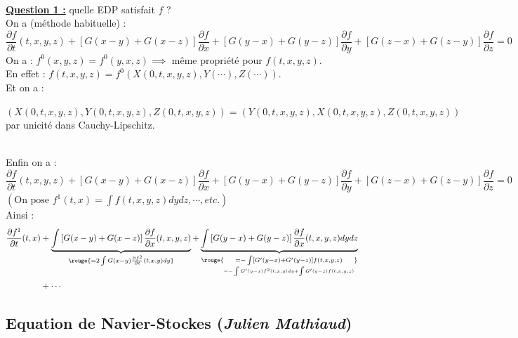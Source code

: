 \documentclass[12pt,a4paper]{article}
\begin{document}
		\begin{sol}$ $\\
			\begin{minipage}[t]{18.5cm}
				\textbf{\underline{Question 1 :}} quelle EDP satisfait $f$ ?\\
			On a (méthode habituelle) : 
			\[\dfrac{\partial f}{\partial t}(t,x,y,z)+\left[G(x-y)+G(x-z)\right]\dfrac{\partial f}{\partial x} + \left[G(y-x)+G(y-z)\right]\dfrac{\partial f}{\partial y} + \left[G(z-x)+G(z-y)\right]\dfrac{\partial f}{\partial z} = 0\]
			On a : $f^0(x,y,z) = f^0(y,x,z) \implies$ même propriété pour $f(t,x,y,z)$.\\
			En effet : $f(t,x,y,z) = f^0(X(0,t,x,y,z),Y(\cdots),Z(\cdots))$.\\
			Et on a : \begin{minipage}[t]{17cm}
				$(X(0,t,x,y,z),Y(0,t,x,y,z),Z(0,t,x,y,z)) = (Y(0,t,x,y,z),X(0,t,x,y,z),Z(0,t,x,y,z))$ par unicité dans Cauchy-Lipschitz.
			\end{minipage}\\
			Enfin on a : 
			\[\dfrac{\partial f}{\partial t}(t,x,y,z)+\left[G(x-y)+G(x-z)\right]\dfrac{\partial f}{\partial x} + \left[G(y-x)+G(y-z)\right]\dfrac{\partial f}{\partial y} + \left[G(z-x)+G(z-y)\right]\dfrac{\partial f}{\partial z} = 0\]
			$\left(\text{On pose } f^1(t,x) = \displaystyle\int f(t,x,y,z) dydz,\cdots,etc.\right)$\\
			
			Ainsi :
			\[\begin{aligned}
				\dfrac{\partial f^1}{\partial t}(t,x) 
			&+ \displaystyle\underbrace{\int\left[G(x-y)+G(x-z)\right]\dfrac{\partial f}{\partial x}(t,x,y,z)}_{\rouge{=2\int G(x-y)\frac{\partial f^2}{\partial t}(t,x,y) dy}} + \underbrace{\int\left[G(y-x)+G(y-z)\right]\dfrac{\partial f}{\partial x}(t,x,y,z)dydz}_{\rouge{\underset{= -\int G'(y-x)f^2(t,x,y)dy + \int G'(y-z)f(t,x,y,z)}{=-\int\left[G'(y-x)+G'(y-z)\right]f(t,x,y,z)}}}\\
			&+\cdots
			\end{aligned}\]
			\end{minipage}
		\end{sol}
		
	\newpage
		
	\subsection{Equation de Navier-Stockes (\small{\textit{Julien Mathiaud})}}
	
\end{document}
